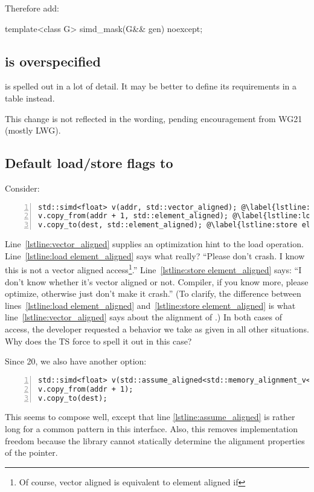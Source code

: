 Therefore add:
\begin{wgText}
\begin{itemdecl}
template<class G> simd_mask(G&& gen) noexcept;
\end{itemdecl}
\end{wgText}

\subsection{ is overspecified}
 is spelled out in a lot of detail.
It may be better to define its requirements in a table instead.

This change is not reflected in the wording, pending encouragement from WG21 (mostly LWG).

\subsection{Default load/store flags to }

Consider:
\medskip\begin{lstlisting}[style=Vc,numbers=left]
std::simd<float> v(addr, std::vector_aligned); @\label{lstline:vector_aligned}@
v.copy_from(addr + 1, std::element_aligned); @\label{lstline:load element_aligned}@
v.copy_to(dest, std::element_aligned); @\label{lstline:store element_aligned}@
\end{lstlisting}
Line~\ref{lstline:vector_aligned} supplies an optimization hint to the load operation.
Line~\ref{lstline:load element_aligned} says what really?
“Please don't crash.
I know this is not a vector aligned access\footnote{Of course, vector aligned is equivalent to element aligned if }.”
Line~\ref{lstline:store element_aligned} says:
“I don't know whether it's vector aligned or not.
Compiler, if you know more, please optimize, otherwise just don't make it crash.”
(To clarify, the difference between lines~\ref{lstline:load element_aligned} and~\ref{lstline:store element_aligned} is what line~\ref{lstline:vector_aligned} says about the alignment of .)
In both cases of  access, the developer requested a behavior we take as given in all other situations.
Why does the TS force to spell it out in this case?

Since \CC{}20, we also have another option:
\medskip\begin{lstlisting}[numbers=left]
std::simd<float> v(std::assume_aligned<std::memory_alignment_v<std::simd<float>>>(addr)); @\label{lstline:assume_aligned}@
v.copy_from(addr + 1);
v.copy_to(dest);
\end{lstlisting}
This seems to compose well, except that line \ref{lstline:assume_aligned} is rather long for a common pattern in this interface.
Also, this removes implementation freedom because the library cannot statically determine the alignment properties of the pointer.

